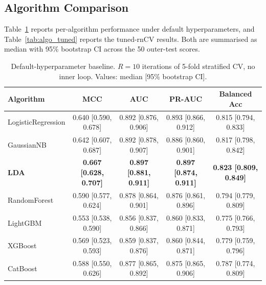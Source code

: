 \subsection{Algorithm Comparison}
\label{sec:results_algocomp}

Table~\ref{tab:algo_baseline} reports per-algorithm performance under default hyperparameters, and Table~\ref{tab:algo_tuned} reports the tuned-rnCV results. Both are summarised as median with 95\% bootstrap CI across the 50 outer-test scores.

\begin{table}[t]
    \centering
    \small
    \caption{Default-hyperparameter baseline. $R = 10$ iterations of 5-fold stratified CV, no inner loop. Values: median [95\% bootstrap CI].}
    \label{tab:algo_baseline}
    \begin{tabular}{lcccc}
        \toprule
        \textbf{Algorithm} & \textbf{MCC} & \textbf{AUC} & \textbf{PR-AUC} & \textbf{Balanced Acc} \\
        \midrule
        LogisticRegression & 0.640 [0.590, 0.678] & 0.892 [0.876, 0.906] & 0.893 [0.866, 0.912] & 0.815 [0.794, 0.833] \\
        GaussianNB         & 0.642 [0.607, 0.687] & 0.892 [0.878, 0.907] & 0.886 [0.860, 0.901] & 0.817 [0.798, 0.842] \\
        \textbf{LDA}       & \textbf{0.667 [0.628, 0.707]} & \textbf{0.897 [0.881, 0.911]} & \textbf{0.897 [0.874, 0.911]} & \textbf{0.823 [0.809, 0.849]} \\
        RandomForest       & 0.590 [0.577, 0.624] & 0.878 [0.864, 0.901] & 0.876 [0.861, 0.896] & 0.794 [0.779, 0.809] \\
        LightGBM           & 0.553 [0.538, 0.590] & 0.856 [0.837, 0.866] & 0.860 [0.833, 0.871] & 0.775 [0.766, 0.793] \\
        XGBoost            & 0.569 [0.523, 0.593] & 0.859 [0.837, 0.876] & 0.860 [0.844, 0.871] & 0.779 [0.759, 0.796] \\
        CatBoost           & 0.588 [0.550, 0.626] & 0.877 [0.865, 0.892] & 0.875 [0.865, 0.906] & 0.787 [0.774, 0.809] \\
        \bottomrule
    \end{tabular}
\end{table}

